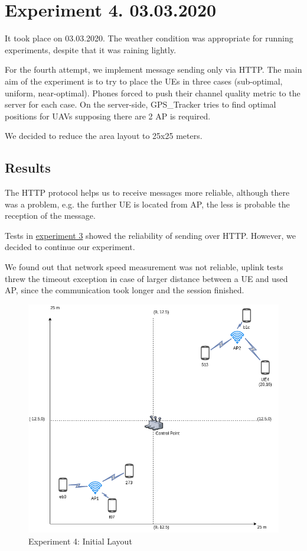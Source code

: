 \hypertarget{experiment-4.-03.03.2020}{%
\section{Experiment 4. 03.03.2020}\label{experiment-4.-03.03.2020}}

It took place on 03.03.2020. The weather condition was appropriate for running experiments, despite that it was raining lightly.

For the fourth attempt, we implement message sending only via HTTP. The main aim of the experiment is to try to place the UEs in three cases (sub-optimal, uniform, near-optimal). Phones forced to push their channel quality metric to the server for each case. On the server-side, GPS\_Tracker tries to find optimal positions for UAVs supposing there are 2 AP is required.

We decided to reduce the area layout to 25x25 meters.

\hypertarget{results}{%
\subsection{Results}\label{results}}

The HTTP protocol helps us to receive messages more reliable, although there was a problem, e.g. the further UE is located from AP, the less is probable the reception of the message.

Tests in \href{06-attempt-03.md}{experiment 3} showed
the reliability of sending over HTTP. However, we decided to continue our experiment.

We found out that network speed measurement was not reliable, uplink tests threw the timeout exception in case of larger distance between a UE and used AP, since the communication took longer and the session finished.

\begin{figure}[H]
	\centering
	\includegraphics[width=\linewidth,keepaspectratio]{images/05-cases-description-Exp-4-Initial-Layout.png}
\caption{Experiment 4: Initial Layout}
\end{figure}

